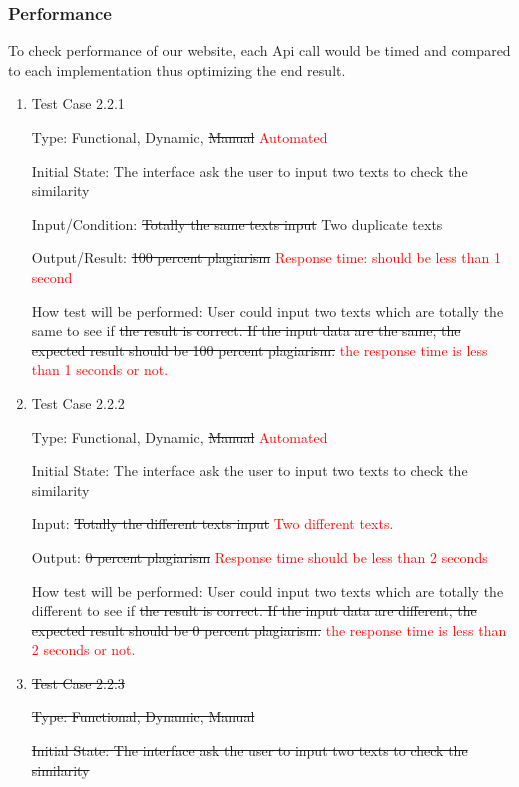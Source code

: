 \documentclass[12pt, titlepage]{article}
\begin{document}
\subsubsection{Performance}
To check performance of our website, each Api call would be timed and compared to each implementation thus optimizing the end result.
\begin{enumerate}
\item{Test Case 2.2.1\\}

Type: Functional, Dynamic, \st{Manual} \textcolor{red}{Automated} 
					
Initial State: The interface ask the user to input two texts to check the similarity
					
Input/Condition: \st{Totally the same texts input} Two duplicate texts
					
Output/Result: \st{100 percent plagiarism} \textcolor{red}{Response time: should be less than 1 second}
					
How test will be performed: User could input two texts which are totally the same to see if \st{the result is correct. If the input data are the same, the expected result should be 100 percent plagiarism.} \textcolor{red}{the response time is less than 1 seconds or not.}
					
\item{Test Case 2.2.2\\}

Type: Functional, Dynamic, \st{Manual} \textcolor{red}{Automated}
					
Initial State: The interface ask the user to input two texts to check the similarity
					
Input: \st{Totally the different texts input} \textcolor{red}{ Two different texts.}
					
Output: \st{0 percent plagiarism} \textcolor{red}{Response time should be less than 2 seconds}
					
How test will be performed: User could input two texts which are totally the different to see if \st{the result is correct. If the input data are different, the expected result should be 0 percent plagiarism.} \textcolor{red}{the response time is less than 2 seconds or not.}

\item{\st{Test Case 2.2.3}\\}

\st{Type: Functional, Dynamic, Manual}
					
\st{Initial State: The interface ask the user to input two texts to check the similarity}
					

\end{enumerate}
\end{document}
